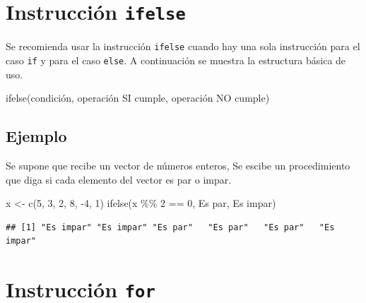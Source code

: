 \documentclass[
]{book}
\newenvironment{Shaded}{\begin{snugshade}}{\end{snugshade}}
\newcommand{\DecValTok}[1]{\textcolor[rgb]{0.00,0.00,0.81}{#1}}
\newcommand{\FunctionTok}[1]{\textcolor[rgb]{0.00,0.00,0.00}{#1}}
\newcommand{\NormalTok}[1]{#1}
\newcommand{\OtherTok}[1]{\textcolor[rgb]{0.56,0.35,0.01}{#1}}
\newcommand{\SpecialCharTok}[1]{\textcolor[rgb]{0.00,0.00,0.00}{#1}}
\newcommand{\StringTok}[1]{\textcolor[rgb]{0.31,0.60,0.02}{#1}}
\begin{document}
\hypertarget{instrucciuxf3n-ifelse}{%
\section{\texorpdfstring{Instrucción \texttt{ifelse}}{Instrucción ifelse}}\label{instrucciuxf3n-ifelse}}

Se recomienda usar la instrucción \texttt{ifelse} cuando hay una sola instrucción para el caso \texttt{if} y para el caso \texttt{else}. A continuación se muestra la estructura básica de uso.

\begin{Shaded}
\begin{Highlighting}[]
\FunctionTok{ifelse}\NormalTok{(condición, operación SI cumple, operación NO cumple)}
\end{Highlighting}
\end{Shaded}

\hypertarget{ejemplo-16}{%
\subsection*{Ejemplo}\label{ejemplo-16}}

Se supone que recibe un vector de números enteros, Se escibe un procedimiento que diga si cada elemento del vector es par o impar.

\begin{Shaded}
\begin{Highlighting}[]
\NormalTok{x }\OtherTok{\textless{}{-}} \FunctionTok{c}\NormalTok{(}\DecValTok{5}\NormalTok{, }\DecValTok{3}\NormalTok{, }\DecValTok{2}\NormalTok{, }\DecValTok{8}\NormalTok{, }\SpecialCharTok{{-}}\DecValTok{4}\NormalTok{, }\DecValTok{1}\NormalTok{)}
\FunctionTok{ifelse}\NormalTok{(x }\SpecialCharTok{\%\%} \DecValTok{2} \SpecialCharTok{==} \DecValTok{0}\NormalTok{, }\StringTok{\textquotesingle{}Es par\textquotesingle{}}\NormalTok{, }\StringTok{\textquotesingle{}Es impar\textquotesingle{}}\NormalTok{)}
\end{Highlighting}
\end{Shaded}

\begin{verbatim}
## [1] "Es impar" "Es impar" "Es par"   "Es par"   "Es par"   "Es impar"
\end{verbatim}

\hypertarget{instrucciuxf3n-for}{%
\section{\texorpdfstring{Instrucción \texttt{for}}{Instrucción for}}\label{instrucciuxf3n-for}}
\end{document}

